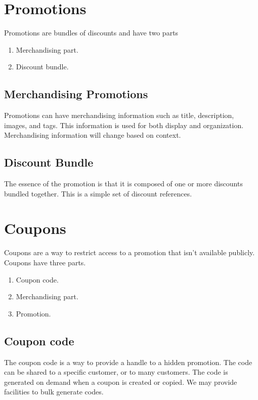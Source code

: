 \documentclass[11pt]{article}
\begin{document}
\section{Promotions}

Promotions are bundles of discounts and have two parts

\begin{enumerate}
    \item Merchandising part.
    \item Discount bundle.
\end{enumerate}
\subsection{Merchandising Promotions}

Promotions can have merchandising information such as title, description, images,
and tags. This information is used for both display and organization. Merchandising
information will change based on context.

\subsection{Discount Bundle}

The essence of the promotion is that it is composed of one or more discounts bundled
together. This is a simple set of discount references.

\section{Coupons}

Coupons are a way to restrict access to a promotion that isn't available publicly. 
Coupons have three parts.

\begin{enumerate}
    \item Coupon code.
    \item Merchandising part.
    \item Promotion.
\end{enumerate}

\subsection{Coupon code}

The coupon code is a way to provide a handle to a hidden promotion. The code can
be shared to a specific customer, or to many customers. The code is generated
on demand when a coupon is created or copied. We may provide facilities to 
bulk generate codes.
\end{document}
